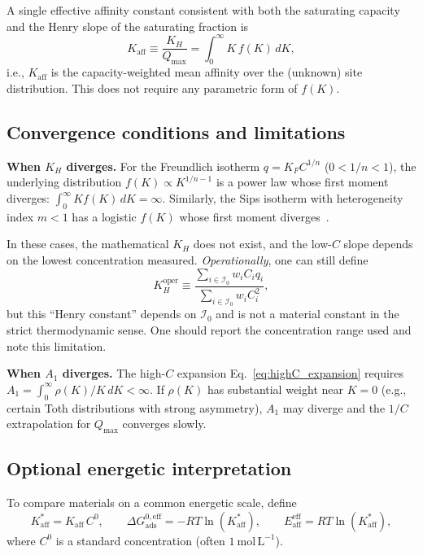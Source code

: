 \documentclass[12pt]{article}
\begin{document}
A single effective affinity constant consistent with both the saturating
capacity and the Henry slope of the saturating fraction
is~\cite{Klotz1971,Nederlof1990}
\begin{equation}
  K_{\mathrm{aff}} \equiv \frac{K_H}{Q_{\max}}
  = \int_0^\infty K\,f(K)\,dK,
  \label{eq:Kaff_def}
\end{equation}
i.e., $K_{\mathrm{aff}}$ is the capacity-weighted mean affinity over the
(unknown) site distribution.  This does not require any parametric form
of $f(K)$.

\subsection{Convergence conditions and limitations}
\label{sec:convergence}

\textbf{When $K_H$ diverges.}
For the Freundlich isotherm $q=K_F C^{1/n}$ ($0<1/n<1$), the underlying
distribution $f(K)\propto K^{1/n-1}$ is a power law whose first moment
diverges: $\int_0^\infty K f(K)\,dK=\infty$.  Similarly, the Sips
isotherm with heterogeneity index $m<1$ has a logistic $f(K)$ whose
first moment diverges~\cite{Jaroniec1988}.

In these cases, the mathematical $K_H$ does not exist, and the low-$C$
slope depends on the lowest concentration measured.
\emph{Operationally}, one can still define
\begin{equation}
  K_H^{\mathrm{oper}} \equiv
  \frac{\sum_{i\in\mathcal{I}_0} w_i C_i q_i}
       {\sum_{i\in\mathcal{I}_0} w_i C_i^2},
  \label{eq:KH_operational}
\end{equation}
but this ``Henry constant'' depends on $\mathcal{I}_0$ and is not a
material constant in the strict thermodynamic sense.  One should report
the concentration range used and note this limitation.

\textbf{When $A_1$ diverges.}
The high-$C$ expansion Eq.~\eqref{eq:highC_expansion} requires
$A_1=\int_0^\infty\rho(K)/K\,dK<\infty$.  If $\rho(K)$ has substantial
weight near $K=0$ (e.g., certain Toth distributions with strong
asymmetry), $A_1$ may diverge and the $1/C$ extrapolation for
$Q_{\max}$ converges slowly.

\subsection{Optional energetic interpretation}

To compare materials on a common energetic scale, define
\begin{equation}
  K_{\mathrm{aff}}^\ast = K_{\mathrm{aff}}\,C^0,
  \qquad
  \Delta G_{\mathrm{ads}}^{0,\mathrm{eff}} = -RT\ln(K_{\mathrm{aff}}^\ast),
  \qquad
  E_{\mathrm{aff}}^{\mathrm{eff}} = RT\ln(K_{\mathrm{aff}}^\ast),
\end{equation}
where $C^0$ is a standard concentration (often $1~\mathrm{mol\,L^{-1}}$).
\end{document}

